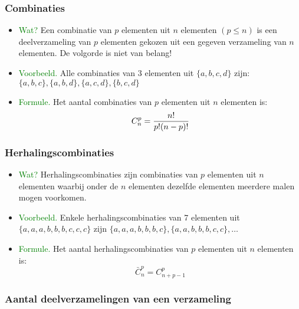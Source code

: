 \subsubsection{Combinaties} \label{combinaties}
\begin{itemize}
\item \textcolor{green}{Wat?} \newline
Een combinatie van $p$ elementen uit $n$ elementen $(p \leq n)$ is een deelverzameling van $p$ elementen gekozen uit een gegeven verzameling van $n$ elementen. De volgorde is niet van belang!
\item \textcolor{green}{Voorbeeld.} \newline
Alle combinaties van 3 elementen uit $\{a, b, c, d\}$ zijn: $\{a, b, c\}, \{a, b, d\}, \{a, c, d\}, \{b, c, d\}$
\item \textcolor{green}{Formule.} \newline
Het aantal combinaties van $p$ elementen uit $n$ elementen is:
\[C^p_n=\displaystyle\frac{\displaystyle n!}{\displaystyle p!(n-p)!}\]
\end{itemize}

\hypertarget{herhalingscombinaties}{}
\subsubsection{Herhalingscombinaties} \label{herhalingscombinaties}
\begin{itemize}
\item \textcolor{green}{Wat?}\newline
Herhalingscombinaties zijn combinaties van $p$ elementen uit $n$ elementen waarbij onder de $n$ elementen dezelfde elementen meerdere malen mogen voorkomen.
\item \textcolor{green}{Voorbeeld.} \newline
Enkele herhalingscombinaties van 7 elementen uit $\{a, a, a, b, b, b, c, c, c\}$ zijn $\{a, a, a, b, b, b, c\}, \{a, a, b, b, b, c, c\}, \ldots$
\item \textcolor{green}{Formule.} \newline
Het aantal herhalingscombinaties van $p$ elementen uit $n$ elementen is:
\[\bar{C}^p_n=C^p_{n+p-1}\]
\end{itemize}

\hypertarget{aantal_deelverzamelingen}{}
\subsubsection{Aantal deelverzamelingen van een verzameling} \label{aantal_deelverzamelingen}


